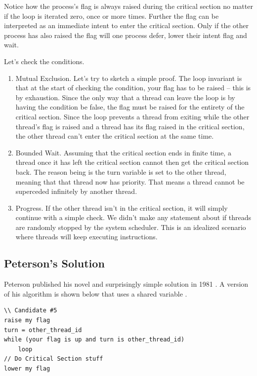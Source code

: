 Notice how the process's flag is always raised during the critical section no matter if the loop is iterated zero, once or more times.
Further the flag can be interpreted as an immediate intent to enter the critical section.
Only if the other process has also raised the flag will one process defer, lower their intent flag and wait.

Let's check the conditions.

\begin{enumerate}
\item Mutual Exclusion. Let's try to sketch a simple proof.
  The loop invariant is that at the start of checking the condition, your flag has to be raised -- this is by exhaustion.
  Since the only way that a thread can leave the loop is by having the condition be false, the flag must be raised for the entirety of the critical section.
  Since the loop prevents a thread from exiting while the other thread's flag is raised and a thread has its flag raised in the critical section, the other thread can't enter the critical section at the same time.
\item Bounded Wait.
  Assuming that the critical section ends in finite time, a thread once it has left the critical section cannot then get the critical section back.
  The reason being is the turn variable is set to the other thread, meaning that that thread now has priority.
  That means a thread cannot be superceded infinitely by another thread.
\item Progress.  If the other thread isn't in the critical section, it will simply continue with a simple check. We didn't make any statement about if threads are randomly stopped by the system scheduler.
  This is an idealized scenario where threads will keep executing instructions.
\end{enumerate}

\subsection{Peterson's Solution}

Peterson published his novel and surprisingly simple solution in 1981 \cite{Peterson1981MythsAT}.
A version of his algorithm is shown below that uses a shared variable .

\begin{lstlisting}
\\ Candidate #5
raise my flag
turn = other_thread_id
while (your flag is up and turn is other_thread_id)
    loop
// Do Critical Section stuff
lower my flag
\end{lstlisting}

